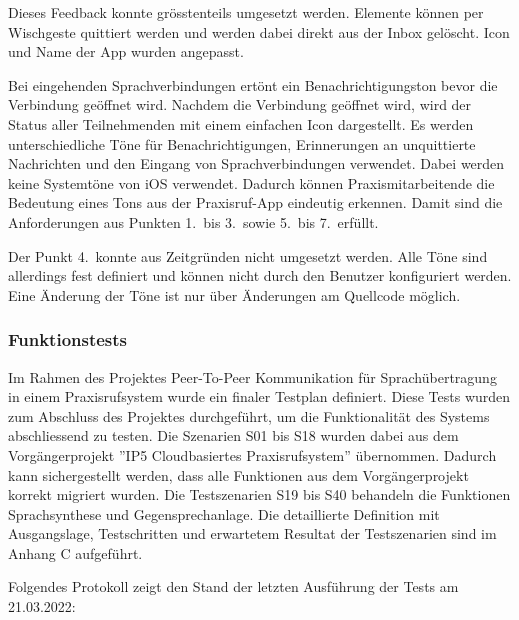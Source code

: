 Dieses Feedback konnte grösstenteils umgesetzt werden.
Elemente können per Wischgeste quittiert werden und werden dabei direkt aus der Inbox gelöscht.
Icon und Name der App wurden angepasst.

Bei eingehenden Sprachverbindungen ertönt ein Benachrichtigungston bevor die Verbindung geöffnet wird.
Nachdem die Verbindung geöffnet wird, wird der Status aller Teilnehmenden mit einem einfachen Icon dargestellt.
Es werden unterschiedliche Töne für Benachrichtigungen, Erinnerungen an unquittierte Nachrichten und den Eingang von Sprachverbindungen verwendet.
Dabei werden keine Systemtöne von iOS verwendet.
Dadurch können Praxismitarbeitende die Bedeutung eines Tons aus der Praxisruf-App eindeutig erkennen.
Damit sind die Anforderungen aus Punkten 1.\ bis 3.\ sowie 5.\ bis 7.\ erfüllt.

Der Punkt 4.\ konnte aus Zeitgründen nicht umgesetzt werden.
Alle Töne sind allerdings fest definiert und können nicht durch den Benutzer konfiguriert werden.
Eine Änderung der Töne ist nur über Änderungen am Quellcode möglich.

\clearpage

\subsubsection{Funktionstests}

Im Rahmen des Projektes Peer-To-Peer Kommunikation für Sprachübertragung in einem Praxisrufsystem wurde ein finaler Testplan definiert.
Diese Tests wurden zum Abschluss des Projektes durchgeführt, um die Funktionalität des Systems abschliessend zu testen.
Die Szenarien S01 bis S18 wurden dabei aus dem Vorgängerprojekt ''IP5 Cloudbasiertes Praxisrufsystem'' übernommen.
Dadurch kann sichergestellt werden, dass alle Funktionen aus dem Vorgängerprojekt korrekt migriert wurden.
Die Testszenarien S19 bis S40 behandeln die Funktionen Sprachsynthese und Gegensprechanlage.
Die detaillierte Definition mit Ausgangslage, Testschritten und erwartetem Resultat der Testszenarien sind im Anhang C aufgeführt.

Folgendes Protokoll zeigt den Stand der letzten Ausführung der Tests am 21.03.2022:

